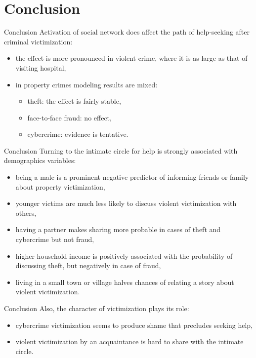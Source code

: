\documentclass{beamer}
\begin{document}
	\section{Conclusion}
	\begin{frame}{Conclusion}
	Activation of social network does affect the path of help-seeking after criminal victimization:
			\begin{itemize}
				\item the effect is more pronounced in violent crime, where it is as large as that of visiting hospital,
				\item in property crimes modeling results are mixed: 
				\begin{itemize}
					\item theft: the effect is fairly stable,
					\item face-to-face fraud: no effect,
					\item cybercrime: evidence is tentative.
				\end{itemize}
			\end{itemize}
	\end{frame}

	\begin{frame}{Conclusion}
		Turning to the intimate circle for help is strongly associated with demographics variables:
		\begin{itemize}
			 \item being a male is a prominent negative predictor of informing friends or family about property victimization,
			\item younger victims are much less likely to discuss violent victimization with others,
			\item having a partner makes sharing more probable in cases of theft and cybercrime but not fraud,
			\item higher household income is positively associated with the probability of discussing theft, but negatively in case of fraud,
			\item living in a small town or village halves chances of relating a story about violent victimization. 
		\end{itemize}
	\end{frame}

	\begin{frame}{Conclusion}
		Also, the character of victimization plays its role:
		\begin{itemize}
			\item cybercrime victimization seems to produce shame that precludes seeking help,
			\item violent victimization by an acquaintance is hard to share with the intimate circle.
		\end{itemize}
	\end{frame}
\end{document}
